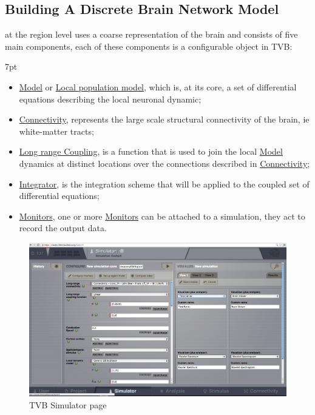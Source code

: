 \documentclass{tufte-handout}
\newenvironment{blah}{%
  \def\FrameCommand{%
    \hspace{1pt}%
    {\color{DarkOrange}\vrule width 2pt}%
    {\color{PeachPuff}\vrule width 4pt}%
    \colorbox{PeachPuff}%
  }%
  \MakeFramed{\advance\hsize-\width\FrameRestore}%
  \noindent\hspace{-4.55pt}%
  \begin{adjustwidth}{}{7pt}%
  \vspace{2pt}\vspace{2pt}%
}
{%
  \vspace{2pt}\end{adjustwidth}\endMakeFramed%
}
\begin{document}
\subsection{Building A Discrete Brain Network Model}\label{sec:region_simulations}

 at the region level uses a coarse representation of the brain and consists of
five main components, each of these components is a configurable object in
TVB:
\begin{blah}
\begin{itemize}
\item \underline{Model} or \underline{Local population model}, which is, at its core, a set of differential equations describing the local neuronal dynamic;
\item \underline{Connectivity}, represents the large scale structural connectivity of the brain, ie white-matter tracts;
\item \underline{Long range Coupling}, is a function that is used to join the local \underline{Model} dynamics at distinct locations over the connections described in \underline{Connectivity};
\item \underline{Integrator}, is the integration scheme that will be applied to the coupled set of differential equations;
\item \underline{Monitors}, one or more \underline{Monitors} can be attached to a simulation, they act to record the output data.
\end{itemize}
\end{blah}

\begin{figure}[h]
  \includegraphics[width=\linewidth]{Handout_UI_BuildingYourOwnBrainNetworkModel_SimulatorArea}%
  \caption{TVB Simulator page}%
  \label{fig:fig}%
\end{figure}
\end{document}
